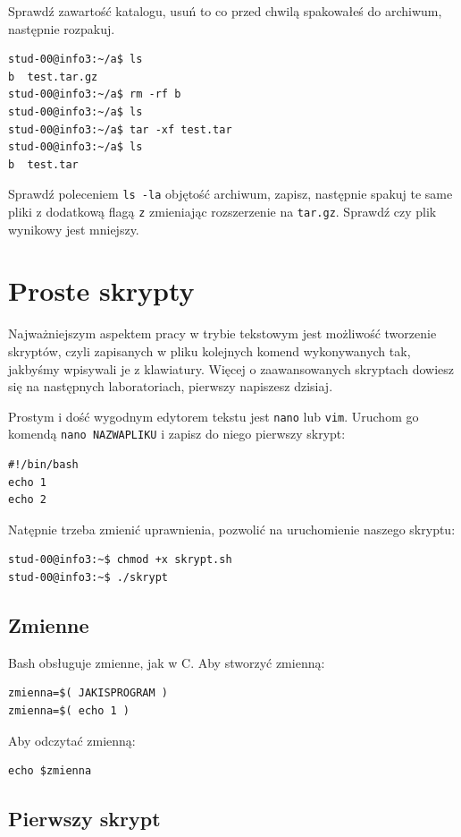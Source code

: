 \documentclass[landscape]{article}
\begin{document}
Sprawdź zawartość katalogu, usuń to co przed chwilą spakowałeś do archiwum, następnie rozpakuj.

\begin{verbatim}
stud-00@info3:~/a$ ls
b  test.tar.gz
stud-00@info3:~/a$ rm -rf b
stud-00@info3:~/a$ ls
stud-00@info3:~/a$ tar -xf test.tar
stud-00@info3:~/a$ ls
b  test.tar
\end{verbatim}

Sprawdź poleceniem {\tt ls -la} objętość archiwum, zapisz, następnie spakuj te same pliki z dodatkową flagą {\tt z} zmieniając rozszerzenie na {\tt tar.gz}. Sprawdź czy plik wynikowy jest mniejszy.


\section{Proste skrypty}
Najważniejszym aspektem pracy w trybie tekstowym jest możliwość tworzenie skryptów, czyli zapisanych w pliku kolejnych komend wykonywanych tak, jakbyśmy wpisywali je z klawiatury. Więcej o zaawansowanych skryptach dowiesz się na następnych laboratoriach, pierwszy napiszesz dzisiaj.

Prostym i dość wygodnym edytorem tekstu jest {\tt nano} lub {\tt vim}. Uruchom go komendą {\tt nano NAZWAPLIKU} i zapisz do niego pierwszy skrypt:
\begin{verbatim}
#!/bin/bash
echo 1
echo 2
\end{verbatim}

Natępnie trzeba zmienić uprawnienia, pozwolić na uruchomienie naszego skryptu: 
\begin{verbatim}
stud-00@info3:~$ chmod +x skrypt.sh
stud-00@info3:~$ ./skrypt
\end{verbatim}

\subsection{Zmienne}
Bash obsługuje zmienne, jak w C. Aby stworzyć zmienną:
\begin{verbatim}
zmienna=$( JAKISPROGRAM )
zmienna=$( echo 1 )
\end{verbatim}

Aby odczytać zmienną:
\begin{verbatim}
echo $zmienna
\end{verbatim}

\subsection{Pierwszy skrypt}
\end{document}
